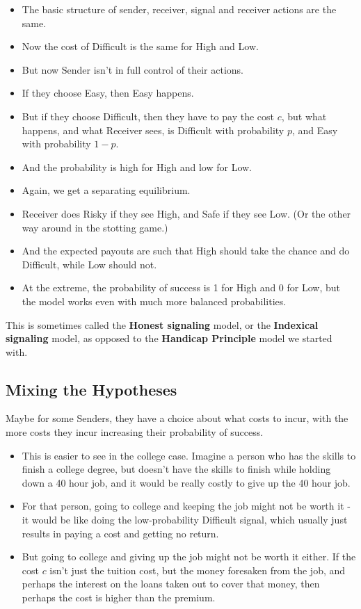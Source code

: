 \documentclass[
  11pt,
]{article}
\providecommand{\tightlist}{%
  \setlength{\itemsep}{0pt}\setlength{\parskip}{0pt}}
\begin{document}
\begin{itemize}
\tightlist
\item
  The basic structure of sender, receiver, signal and receiver actions
  are the same.
\item
  Now the cost of Difficult is the same for High and Low.
\item
  But now Sender isn't in full control of their actions.
\item
  If they choose Easy, then Easy happens.
\item
  But if they choose Difficult, then they have to pay the cost \(c\),
  but what happens, and what Receiver sees, is Difficult with
  probability \(p\), and Easy with probability \(1-p\).
\item
  And the probability is high for High and low for Low.
\item
  Again, we get a separating equilibrium.
\item
  Receiver does Risky if they see High, and Safe if they see Low. (Or
  the other way around in the stotting game.)
\item
  And the expected payouts are such that High should take the chance and
  do Difficult, while Low should not.
\item
  At the extreme, the probability of success is 1 for High and 0 for
  Low, but the model works even with much more balanced probabilities.
\end{itemize}

This is sometimes called the \textbf{Honest signaling} model, or the
\textbf{Indexical signaling} model, as opposed to the \textbf{Handicap
Principle} model we started with.

\hypertarget{mixing-the-hypotheses}{%
\subsection{Mixing the Hypotheses}\label{mixing-the-hypotheses}}

Maybe for some Senders, they have a choice about what costs to incur,
with the more costs they incur increasing their probability of success.

\begin{itemize}
\tightlist
\item
  This is easier to see in the college case. Imagine a person who has
  the skills to finish a college degree, but doesn't have the skills to
  finish while holding down a 40 hour job, and it would be really costly
  to give up the 40 hour job.
\item
  For that person, going to college and keeping the job might not be
  worth it - it would be like doing the low-probability Difficult
  signal, which usually just results in paying a cost and getting no
  return.
\item
  But going to college and giving up the job might not be worth it
  either. If the cost \(c\) isn't just the tuition cost, but the money
  foresaken from the job, and perhaps the interest on the loans taken
  out to cover that money, then perhaps the cost is higher than the
  premium.
\end{itemize}
\end{document}
